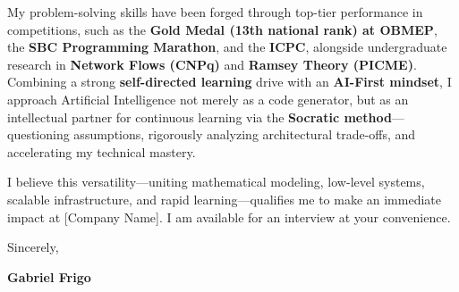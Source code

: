 \documentclass[letterpaper,10pt]{article}
\newcommand{\targetCompany}{[Company Name]}
\begin{document}
My problem-solving skills have been forged through top-tier performance in competitions, such as the \textbf{Gold Medal (13th national rank) at OBMEP}, the \textbf{SBC Programming Marathon}, and the \textbf{ICPC}, alongside undergraduate research in \textbf{Network Flows (CNPq)} and \textbf{Ramsey Theory (PICME)}. Combining a strong \textbf{self-directed learning} drive with an \textbf{AI-First mindset}, I approach Artificial Intelligence not merely as a code generator, but as an intellectual partner for continuous learning via the \textbf{Socratic method}---questioning assumptions, rigorously analyzing architectural trade-offs, and accelerating my technical mastery.

I believe this versatility---uniting mathematical modeling, low-level systems, scalable infrastructure, and rapid learning---qualifies me to make an immediate impact at \targetCompany. I am available for an interview at your convenience.

Sincerely,

\textbf{Gabriel Frigo}
\end{document}
